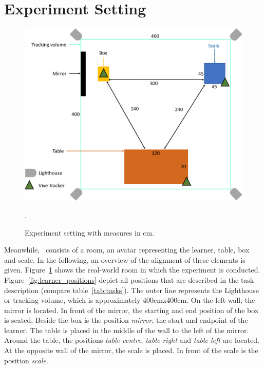 \section{Experiment Setting}
\label{sec:experimentSetting}
\begin{figure}[H]
	\centering
	\includegraphics[width=\textwidth]{figures/study_setting.png}
	\caption[Experiment setting]{Experiment setting with measures in cm.}.
	\label{fig:study_setting}
\end{figure}
Meanwhile, \exgo\ consists of a room, an avatar representing the learner, table, box and scale. In the following, an overview of the alignment of these elements is given. Figure~\ref{fig:study_setting} shows the real-world room in which the experiment is conducted. Figure~\ref{fig:learner_positions} depict all positions that are described in the task description (compare table~\ref{tab:tasks}). The outer line represents the Lighthouse or tracking volume, which is approximately 400cmx400cm. On the left wall, the mirror is located. In front of the mirror, the starting and end position of the box is seated. Beside the box is the position \textit{mirror}, the start and endpoint of the learner. The table is placed in the middle of the wall to the left of the mirror. Around the table, the positions \textit{table centre}, \textit{table right} and \textit{table left} are located. At the opposite wall of the mirror, the scale is placed. In front of the scale is the position \textit{scale}.
